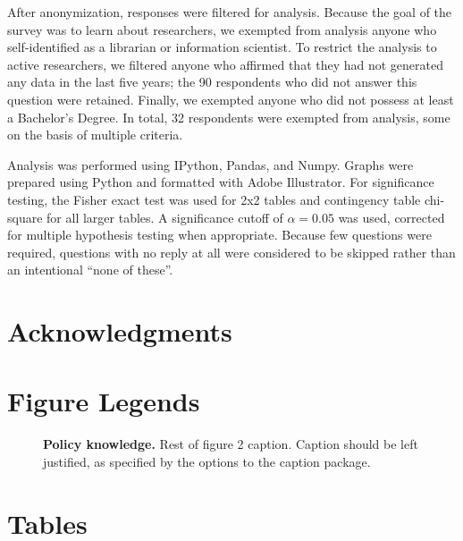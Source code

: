 \documentclass[10pt]{article}
\begin{document}
After anonymization, responses were filtered for analysis.
Because the goal of the survey was to learn about researchers, we exempted from analysis anyone who self-identified as a librarian or information scientist.
To restrict the analysis to active researchers, we filtered anyone who affirmed that they had not generated any data in the last five years; the 90 respondents who did not answer this question were retained.
Finally, we exempted anyone who did not possess at least a Bachelor's Degree.
In total, 32 respondents were exempted from analysis, some on the basis of multiple criteria.

Analysis was performed using IPython\cite{perez_ipython_2007}, Pandas\cite{mckinney-proc-scipy-2010}, and Numpy\cite{van_der_walt_numpy_2011}.
Graphs were prepared using Python and formatted with Adobe Illustrator.
For significance testing, the Fisher exact test was used for 2x2 tables and contingency table chi-square for all larger tables.
A significance cutoff of $\alpha=0.05$ was used, corrected for multiple hypothesis testing when appropriate.
Because few questions were required, questions with no reply at all were considered to be skipped rather than an intentional ``none of these''.


\section*{Acknowledgments}




\section*{Figure Legends}

\begin{figure}[!ht]
\begin{center}
\end{center}
\caption{
{\bf Policy knowledge.}  Rest of figure 2  caption.  Caption 
should be left justified, as specified by the options to the caption 
package.
}
\label{Figure_policy_knowledge}
\end{figure}


\section*{Tables}
\end{document}
